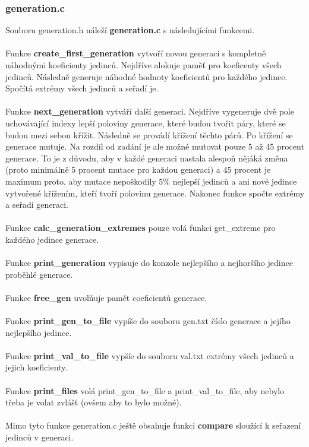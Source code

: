 \documentclass[11pt, a4paper]{article}
\begin{document}
\subsubsection{generation.c}
Souboru generation.h náleží \textbf{generation.c} s následujícími funkcemi.\\\\Funkce \textbf{create\_first\_generation} vytvoří novou generaci s kompletně náhodnými koeficienty jedinců. Nejdříve alokuje paměť pro koeficenty všech jedinců. Následně generuje náhodné hodnoty koeficientů pro každého jedince. Spočítá extrémy všech jedinců a seřadí je.\\\\
Funkce \textbf{next\_generation} vytváří další generaci. Nejdříve vygeneruje dvě pole uchovávající indexy lepší poloviny generace, které budou tvořit páry, které se budou mezi sebou křížit. Následně se provádí křížení těchto párů. Po křížení se generace mutuje. Na rozdíl od zadání je ale možné mutovat pouze 5 až 45 procent generace. To je z důvodu, aby v každé generaci nastala alespoň nějáká změna (proto minimálně 5 procent mutace pro každou generaci) a 45 procent je maximum proto, aby mutace nepoškodily 5\% nejlepší jedinců a ani nové jedince vytvořené křížením, kteří tvoří polovinu generace. Nakonec funkce spočte extrémy a seřadí generaci.\\\\
Funkce \textbf{calc\_generation\_extremes} pouze volá funkci get\_extreme pro každého jedince generace.\\\\
Funkce \textbf{print\_generation} vypisuje do konzole nejlepšího a nejhoršího jedince proběhlé generace.\\\\
Funkce \textbf{free\_gen} uvolňuje pamět coeficientů generace.\\\\
Funkce \textbf{print\_gen\_to\_file} vypíše do souboru gen.txt číslo generace a jejího nejlepšího jedince.\\\\
Funkce \textbf{print\_val\_to\_file} vypšíe do souboru val.txt extrémy všech jedinců a jejich koeficienty.\\\\
Funkce \textbf{print\_files} volá print\_gen\_to\_file a print\_val\_to\_file, aby nebylo třeba je volat zvlášť (ovšem aby to bylo možné).\\\\
Mimo tyto funkce generation.c ještě obsahuje funkci \textbf{compare} sloužící k seřazení jedinců v generaci.\\\\
\end{document}
